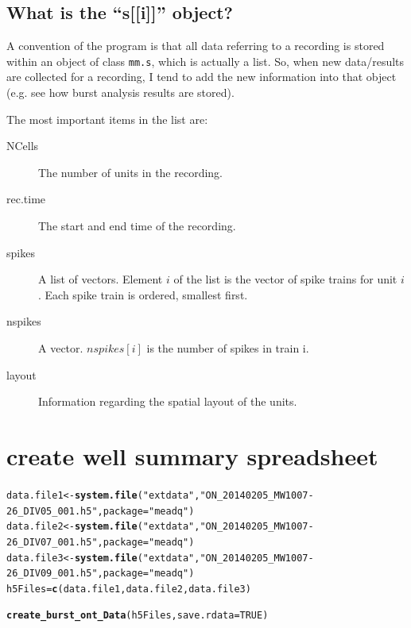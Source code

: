 \documentclass{article}\usepackage[]{graphicx}\usepackage[]{color}
\makeatletter
\newcommand{\hlnum}[1]{\textcolor[rgb]{0.686,0.059,0.569}{#1}}%
\newcommand{\hlstr}[1]{\textcolor[rgb]{0.192,0.494,0.8}{#1}}%
\newcommand{\hlstd}[1]{\textcolor[rgb]{0.345,0.345,0.345}{#1}}%
\newcommand{\hlkwb}[1]{\textcolor[rgb]{0.69,0.353,0.396}{#1}}%
\newcommand{\hlkwc}[1]{\textcolor[rgb]{0.333,0.667,0.333}{#1}}%
\newcommand{\hlkwd}[1]{\textcolor[rgb]{0.737,0.353,0.396}{\textbf{#1}}}%
\newenvironment{kframe}{%
 \def\at@end@of@kframe{}%
 \ifinner\ifhmode%
  \def\at@end@of@kframe{\end{minipage}}%
  \begin{minipage}{\columnwidth}%
 \fi\fi%
 \def\FrameCommand##1{\hskip\@totalleftmargin \hskip-\fboxsep
 \colorbox{shadecolor}{##1}\hskip-\fboxsep
     \hskip-\linewidth \hskip-\@totalleftmargin \hskip\columnwidth}%
 \MakeFramed {\advance\hsize-\width
   \@totalleftmargin\z@ \linewidth\hsize
   \@setminipage}}%
 {\par\unskip\endMakeFramed%
 \at@end@of@kframe}
\newenvironment{knitrout}{}{} %
\makeatother
\begin{document}
\subsection{What is the ``s[[i]]'' object?}

A convention of the program is that all data referring to a recording
is stored within an object of class \texttt{mm.s}, which is actually a
list.  So, when new data/results are collected for a recording, I tend
to add the new information into that object (e.g. see how burst
analysis results are stored).

The most important items in the list are:
\begin{description}
\item[NCells] The number of units in the recording.
\item[rec.time] The start and end time of the recording.
\item[spikes] A list of vectors.  Element $i$ of the list is the
  vector of spike trains for unit $i$.  Each spike train is ordered, smallest first.
\item[nspikes] A vector.  $nspikes[i]$ is the number of spikes in
  train i.
\item[layout] Information regarding the spatial layout of the units.
\end{description}



\section*{create well summary spreadsheet}



\begin{knitrout}
\color{fgcolor}\begin{kframe}
\begin{alltt}
\hlstd{data.file1} \hlkwb{<-} \hlkwd{system.file}\hlstd{(}\hlstr{"extdata"}\hlstd{,} \hlstr{"ON_20140205_MW1007-26_DIV05_001.h5"}\hlstd{,} \hlkwc{package} \hlstd{=} \hlstr{"meadq"}\hlstd{)}
\hlstd{data.file2} \hlkwb{<-} \hlkwd{system.file}\hlstd{(}\hlstr{"extdata"}\hlstd{,} \hlstr{"ON_20140205_MW1007-26_DIV07_001.h5"}\hlstd{,} \hlkwc{package} \hlstd{=} \hlstr{"meadq"}\hlstd{)}
\hlstd{data.file3} \hlkwb{<-} \hlkwd{system.file}\hlstd{(}\hlstr{"extdata"}\hlstd{,} \hlstr{"ON_20140205_MW1007-26_DIV09_001.h5"}\hlstd{,} \hlkwc{package} \hlstd{=} \hlstr{"meadq"}\hlstd{)}
\hlstd{h5Files} \hlkwb{=} \hlkwd{c}\hlstd{(data.file1, data.file2, data.file3)}

\hlkwd{create_burst_ont_Data}\hlstd{(h5Files,} \hlkwc{save.rdata} \hlstd{=} \hlnum{TRUE}\hlstd{)}
\end{alltt}
\end{kframe}
\end{knitrout}
\end{document}
